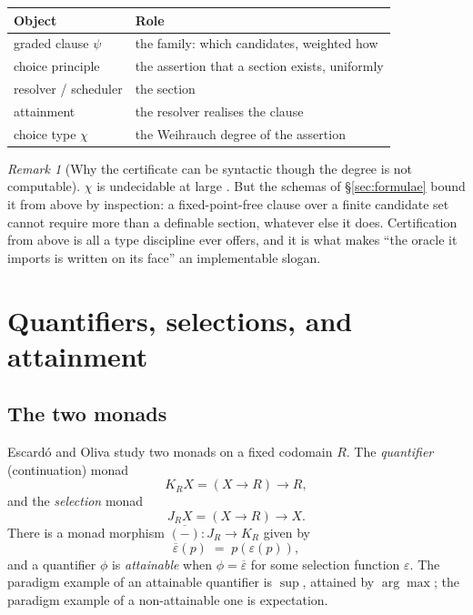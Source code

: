 \documentclass[11pt]{article}
\theoremstyle{definition}
\theoremstyle{plain}
\theoremstyle{remark}
\newtheorem{remark}{Remark}
\begin{document}
\begin{center}
\begin{tabular}{@{}ll@{}}
\toprule
\textbf{Object} & \textbf{Role}\\
\midrule
graded clause $\psi$ & the family: which candidates, weighted how\\
choice principle & the assertion that a section exists, uniformly\\
resolver / scheduler & the section\\
attainment & the resolver realises the clause\\
choice type $\chi$ & the Weihrauch degree of the assertion\\
\bottomrule
\end{tabular}
\end{center}

\begin{remark}[Why the certificate can be syntactic though the degree is not computable]
$\chi$ is undecidable at large \cite{agency}. But the schemas of
\S\ref{sec:formulae} bound it from above by inspection: a fixed-point-free clause over
a finite candidate set cannot require more than a definable section, whatever else it
does. Certification from above is all a type discipline ever offers, and it is what
makes ``the oracle it imports is written on its face'' \cite{choicesched} an
implementable slogan.
\end{remark}

\section{Quantifiers, selections, and attainment}\label{sec:attain}

\subsection{The two monads}

Escard\'o and Oliva \cite{escardo} study two monads on a fixed codomain $R$. The
\emph{quantifier} (continuation) monad
\[
  K_R X = (X \to R) \to R,
\]
and the \emph{selection} monad
\[
  J_R X = (X \to R) \to X .
\]
There is a monad morphism $\overline{(-)} : J_R \to K_R$ given by
\[
  \overline{\varepsilon}(p) \;=\; p(\varepsilon(p)),
\]
and a quantifier $\phi$ is \emph{attainable} when $\phi = \overline{\varepsilon}$ for
some selection function $\varepsilon$. The paradigm example of an attainable
quantifier is $\sup$, attained by $\arg\max$; the paradigm example of a non-attainable
one is expectation.
\end{document}
